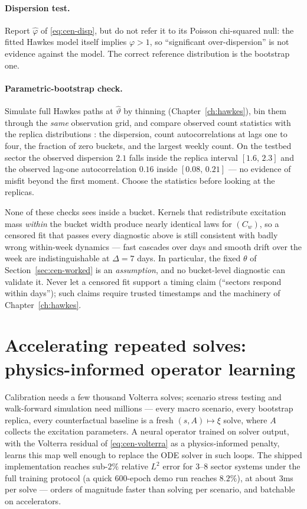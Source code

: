 \paragraph{Dispersion test.}
Report $\hat\varphi$ of \eqref{eq:cen-disp}, but do not refer it to its Poisson
chi-squared null: the fitted Hawkes model itself implies $\varphi > 1$, so
``significant over-dispersion'' is not evidence against the model. The correct reference
distribution is the bootstrap one.

\paragraph{Parametric-bootstrap check.}
Simulate full Hawkes paths at $\hat\vartheta$ by thinning (Chapter~\ref{ch:hawkes}), bin
them through the \emph{same} observation grid, and compare observed count statistics with
the replica distributions \cite{efron1994}: the dispersion, count autocorrelations at
lags one to four, the fraction of zero buckets, and the largest weekly count. On the
testbed sector the observed dispersion $2.1$ falls inside the replica interval
$[1.6,\, 2.3]$ and the observed lag-one autocorrelation $0.16$ inside $[0.08,\, 0.21]$
--- no evidence of misfit beyond the first moment. Choose the statistics before looking
at the replicas.

\begin{warning}
\label{warn:cen-nocheck}
None of these checks sees inside a bucket. Kernels that redistribute excitation mass
\emph{within} the bucket width produce nearly identical laws for $(C_w)$, so a censored
fit that passes every diagnostic above is still consistent with badly wrong within-week
dynamics --- fast cascades over days and smooth drift over the week are
indistinguishable at $\Delta = 7$ days. In particular, the fixed $\theta$ of
Section~\ref{sec:cen-worked} is an \emph{assumption}, and no bucket-level diagnostic can
validate it. Never let a censored fit support a timing claim (``sectors respond within
days''); such claims require trusted timestamps and the machinery of
Chapter~\ref{ch:hawkes}.
\end{warning}

\section{Accelerating repeated solves: physics-informed operator learning}
\label{sec:cen-operator}

Calibration needs a few thousand Volterra solves; scenario stress testing and
walk-forward simulation need millions --- every macro scenario, every bootstrap replica,
every counterfactual baseline is a fresh $(s, A) \mapsto \xi$ solve, where $A$ collects
the excitation parameters. A neural operator trained on solver output, with the Volterra
residual of \eqref{eq:cen-volterra} as a physics-informed penalty, learns this map well
enough to replace the ODE solver in such loops. The shipped implementation reaches
sub-$2\%$ relative $L^2$ error for 3--8 sector systems under the full training protocol (a
quick 600-epoch demo run reaches $8.2\%$), at about $3$ms per solve --- orders of
magnitude faster than solving per scenario, and batchable on accelerators.

